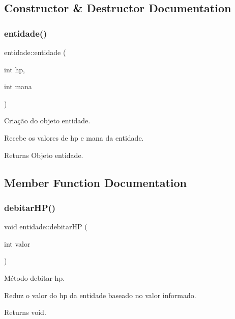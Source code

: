 \subsection{Constructor \& Destructor Documentation}
\mbox{\label{classentidade_a1ae08f868dbdfaa1e85a6799b074d769}} 
\subsubsection{\texorpdfstring{entidade()}{entidade()}}
{\footnotesize\ttfamily entidade\+::entidade (\begin{DoxyParamCaption}\item[{int}]{hp,  }\item[{int}]{mana }\end{DoxyParamCaption})}



Criação do objeto entidade. 

Recebe os valores de hp e mana da entidade. \begin{DoxyReturn}{Returns}
Objeto entidade. 
\end{DoxyReturn}


\subsection{Member Function Documentation}
\mbox{\label{classentidade_abbd3175dda4fa70fd2ef4c7bf8dd6c2e}} 
\subsubsection{\texorpdfstring{debitar\+H\+P()}{debitarHP()}}
{\footnotesize\ttfamily void entidade\+::debitar\+HP (\begin{DoxyParamCaption}\item[{int}]{valor }\end{DoxyParamCaption})}



Método debitar hp. 

Reduz o valor do hp da entidade baseado no valor informado. \begin{DoxyReturn}{Returns}
void. 
\end{DoxyReturn}
\mbox{\label{classentidade_a16d5689ead06cec1a6ad52dde8989e96}} 

